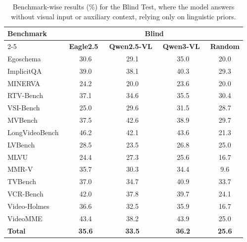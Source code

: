         \begin{table}[h]
        \centering
        \caption{Benchmark-wise results (\%) for the Blind Test, where the model answers without visual input or auxiliary context, relying only on linguistic priors.}
        \footnotesize
        \setlength{\tabcolsep}{4pt}
        \begin{tabular}{lcccc}
        \toprule
        \multirow{2}{*}{\textbf{Benchmark}} & \multicolumn{4}{c}{\scriptsize \textbf{Blind}} \\
        \cmidrule(lr){2-5}
         & {\scriptsize \textbf{Eagle2.5~\cite{eagle25}}} & {\scriptsize \textbf{Qwen2.5-VL}~\cite{qwen25vl}} & {\scriptsize \textbf{Qwen3-VL}~\cite{qwem3_vl}} & {\scriptsize \textbf{Random}} \\
        \midrule
        Egoschema~\cite{egoschema} & 30.6 & 29.1 & 35.0 & 20.0 \\
        ImplicitQA~\cite{implicitqa} & 39.0 & 38.1 & 40.3 & 29.3 \\
        MINERVA~\cite{minerva} & 24.2 & 20.0 & 23.6 & 20.0 \\
        RTV-Bench~\cite{rtvbench} & 37.1 & 34.6 & 35.5 & 30.4 \\
        VSI-Bench~\cite{vsibench} & 25.0 & 29.6 & 31.5 & 28.7 \\
        MVBench~\cite{mvbench} & 37.5 & 42.6 & 38.9 & 29.7 \\
        LongVideoBench~\cite{longvideobench} & 46.2 & 42.1 & 43.6 & 21.3 \\
        LVBench~\cite{lvbench} & 28.5 & 23.5 & 26.8 & 25.0 \\
        MLVU~\cite{mlvu} & 24.4 & 27.3 & 25.6 & 16.7 \\
        MMR-V~\cite{mmrv} & 35.7 & 30.3 & 34.4 & 9.6 \\
        TVBench~\cite{tvbench} & 37.0 & 34.7 & 40.9 & 33.7 \\
        VCR-Bench~\cite{vcrbench} & 42.0 & 37.8 & 39.7 & 24.1 \\
        Video-Holmes~\cite{videoholmes} & 36.6 & 32.5 & 35.9 & 16.7 \\
        VideoMME~\cite{videomme} & 43.4 & 38.2 & 43.9 & 25.0 \\
        \midrule
        \textbf{Total} & \textbf{35.6} & \textbf{33.5} & \textbf{36.2} & \textbf{25.6} \\
        \bottomrule
        \end{tabular}
        \label{tab:blind}
        \end{table}

